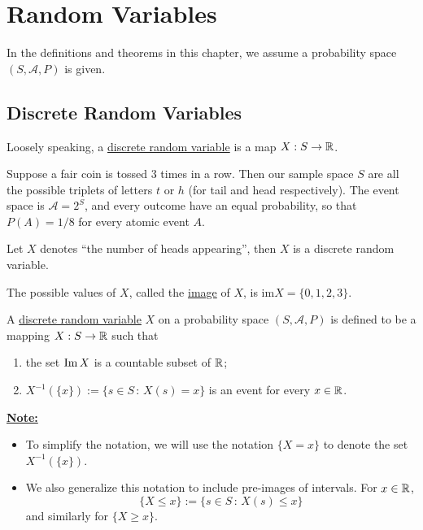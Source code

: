 \chapter{Random Variables}

In the definitions and theorems in this chapter, we assume a probability space $(S, \mathcal{A}, P)$ is given.

\section{Discrete Random Variables}
Loosely speaking, a \underline{discrete random variable} is a map $X : S \rightarrow \mathbb{R}$.

\begin{example}\label{Ex:TossCoinThreeTimes}
Suppose a fair coin is tossed $3$ times in a row. Then our sample space $S$ are all the possible triplets of letters $t$ or $h$ (for tail and head respectively). The event space is $\mathcal{A} = 2^S$, and every outcome have an equal probability, so that $P (A) = 1/8$ for every atomic event $A$.

Let $X$ denotes ``the number of heads appearing'', then $X$ is a discrete random variable. 

The possible values of $X$, called the \underline{image} of $X$, is $\mathrm{im} X = \{ 0 , 1, 2, 3 \}$. 
\end{example}

\begin{definition}\label{D:DiscreteRandomVariable}
A \underline{discrete random variable} $X$ on a probability space $(S, \mathcal{A} , P)$ is defined to be a mapping $X : S \rightarrow \mathbb{R}$ such that
    \begin{enumerate}[label=\alph*)]
        \item the set $\operatorname{Im} X$ is a countable subset of $\mathbb{R}$;
        \item $X^{-1} (\{ x \}) := \{ s \in S \, : \, X (s) = x \}$ is an event for every $x \in \mathbb{R}$.
    \end{enumerate}
\end{definition}
\underline{\textbf{Note:}} 
\begin{itemize}
        \item To simplify the notation, we will use the notation $\{ X = x \}$ to denote the set $X^{-1} (\{ x \})$.
        \item We also generalize this notation to include pre-images of intervals. For $x \in \mathbb{R}$, 
            $$
            \{ X \leq x \} := \{ s \in S \, : \, X(s) \leq x \} 
            $$
        and similarly for $\{ X \geq x \}$.
\end{itemize}

